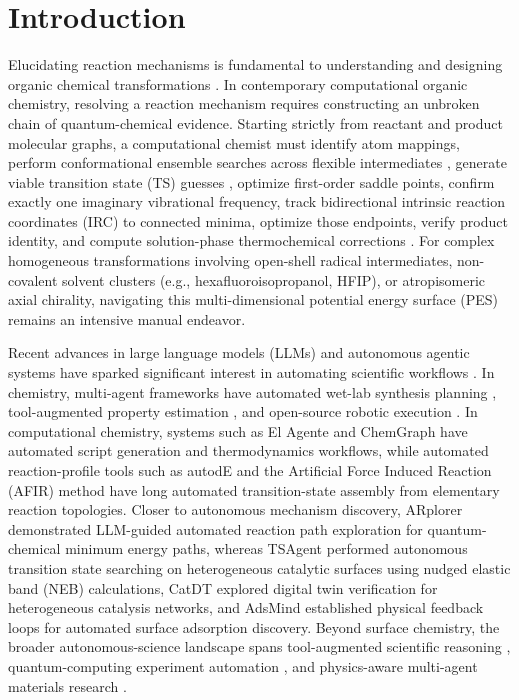 \documentclass[10pt,twocolumn,letterpaper]{article}
\begin{document}
\begin{abstract}
establishing a rigorous paradigm for autonomous discovery in molecular quantum chemistry.
\end{abstract}

\section{Introduction}
Elucidating reaction mechanisms is fundamental to understanding and designing organic chemical transformations \cite{fukui1981irc}. In contemporary computational organic chemistry, resolving a reaction mechanism requires constructing an unbroken chain of quantum-chemical evidence. Starting strictly from reactant and product molecular graphs, a computational chemist must identify atom mappings, perform conformational ensemble searches across flexible intermediates \cite{grimme2019crest}, generate viable transition state (TS) guesses \cite{smidstrup2014idpp}, optimize first-order saddle points, confirm exactly one imaginary vibrational frequency, track bidirectional intrinsic reaction coordinates (IRC) to connected minima, optimize those endpoints, verify product identity, and compute solution-phase thermochemical corrections \cite{grimme2012goodvibes}. For complex homogeneous transformations involving open-shell radical intermediates, non-covalent solvent clusters (e.g., hexafluoroisopropanol, HFIP), or atropisomeric axial chirality, navigating this multi-dimensional potential energy surface (PES) remains an intensive manual endeavor.

Recent advances in large language models (LLMs) and autonomous agentic systems have sparked significant interest in automating scientific workflows \cite{boiko2023autonomous,bran2024chemcrow,swanson2025virtuallab,coscientist2026}. In chemistry, multi-agent frameworks have automated wet-lab synthesis planning \cite{boiko2023autonomous}, tool-augmented property estimation \cite{bran2024chemcrow}, and open-source robotic execution \cite{song2025chemagents}. In computational chemistry, systems such as El Agente \cite{zou2025elagente} and ChemGraph \cite{chemgraph2026} have automated script generation and thermodynamics workflows, while automated reaction-profile tools such as autodE \cite{young2021autode} and the Artificial Force Induced Reaction (AFIR) method \cite{sameera2016afir} have long automated transition-state assembly from elementary reaction topologies. Closer to autonomous mechanism discovery, ARplorer \cite{arplorer2025} demonstrated LLM-guided automated reaction path exploration for quantum-chemical minimum energy paths, whereas TSAgent \cite{tsagent2026} performed autonomous transition state searching on heterogeneous catalytic surfaces using nudged elastic band (NEB) calculations, CatDT \cite{catdt2026} explored digital twin verification for heterogeneous catalysis networks, and AdsMind \cite{adsmind2026} established physical feedback loops for automated surface adsorption discovery. Beyond surface chemistry, the broader autonomous-science landscape spans tool-augmented scientific reasoning \cite{ma2024sciagent}, quantum-computing experiment automation \cite{cao2025agents}, and physics-aware multi-agent materials research \cite{ghafarollahi2024atomatoms}.
\end{document}
